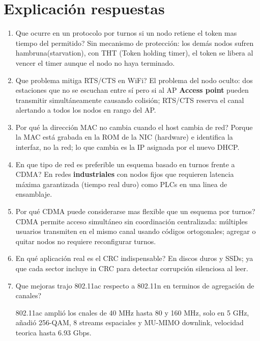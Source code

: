 
\section{Explicación respuestas}

\begin{enumerate}

\item Que ocurre en un protocolo por turnos si un nodo retiene el token mas tiempo del permitido?
Sin mecanismo de protección: los demás nodos sufren hambruna(starvation), con THT (Token holding timer), el token se libera al vencer el timer aunque el nodo no haya terminado.

\item Que problema mitiga RTS/CTS en WiFi?
El problema del nodo oculto: dos estaciones que no se escuchan entre sí pero si al AP \textbf{Access point} pueden transmitir simultáneamente causando colisión; RTS/CTS reserva el canal alertando a todos los nodos en rango del AP.

\item Por qué la dirección MAC no cambia cuando el host cambia de red?
Porque la MAC está grabada en la ROM de la NIC (hardware) e identifica la interfaz, no la red; lo que cambia es la IP asignada por el nuevo DHCP.

\item En que tipo de red es preferible un esquema basado en turnos frente a CDMA?
En redes \textbf{industriales} con nodos fijos que requieren latencia máxima garantizada (tiempo real duro) como PLCs en una linea de ensamblaje.

\item Por qué CDMA puede considerarse mas flexible que un esquema por turnos?
CDMA permite acceso simultáneo sin coordinación centralizada: múltiples usuarios transmiten en el mismo canal usando códigos ortogonales; agregar o quitar nodos no requiere reconfigurar turnos.

\item En qué aplicación real es el CRC indispensable?
En discos duros y SSDs; ya que cada sector incluye in CRC para detectar corrupción silenciosa al leer.

\item Que mejoras trajo 802.11ac respecto a 802.11n en terminos de agregación de canales?

802.11ac amplió los cnales de 40 MHz hasta 80 y 160 MHz, solo en 5 GHz, añadió 256-QAM, 8 streams espaciales y MU-MIMO downlink, velocidad teorica hasta 6.93 Gbps.


\end{enumerate}
